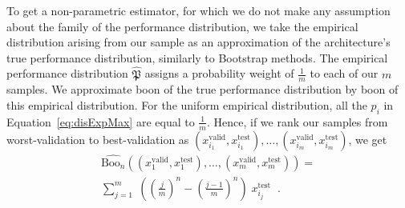 \documentclass{article}
\newcommand{\boo}[1]{\text{Boo}_{#1}}
\newcommand{\tboon}{\gls{boon}\xspace}
\newcommand{\Em}[1]{\boo{#1}}
\newcommand{\emn}{\Em{n}}
\begin{document}
To get a non-parametric estimator, for which we do not make any assumption about the family of the performance distribution, we take the empirical distribution arising from our sample as an approximation of the architecture's true performance distribution, similarly to Bootstrap methods. The empirical performance distribution $\widehat{\mathfrak{P}}$ assigns a probability weight of $\frac{1}{m}$ to each of our $m$ samples. %
We approximate \tboon of the true performance distribution by \tboon of this empirical distribution. For the uniform empirical distribution, all the $p_i$ in Equation~\ref{eq:disExpMax} are equal to $\frac{1}{m}$. Hence, if we rank our samples from worst-validation to best-validation as $(x_{i_1}^\text{valid},x_{i_1}^\text{test}),\dots ,(x_{i_m}^\text{valid},x_{i_m}^\text{test})$, we get
\begin{multline}
 \widehat{\emn} \left((x_1^\text{valid},x_1^\text{test}),\dots ,(x_m^\text{valid},x_m^\text{test})\right) = \\
 \sum_{j=1}^ m\;\left(\left(\frac{j}{m}\right)^n-\left(\frac{j-1}{m}\right)^n \right) \; x_{i_j}^\text{test} \;\;.
\end{multline}

\end{document}
